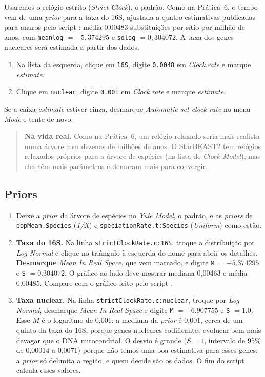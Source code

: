 \documentclass[11pt,a4paper]{article}
\newcommand{\arq}[1]{\path{#1}}
\newcommand{\ui}[1]{\textit{#1}}
\begin{document}
Usaremos o relógio estrito (\ui{Strict Clock}), o padrão. Como na Prática~6, o tempo vem de uma
\emph{prior} para a taxa do 16S, ajustada a quatro estimativas publicadas para anuros
\cite{lemmon2007,fouquet2012sb,gehara2017,dufresnes2022} pelo script \arq{ajuste_taxa.R}: média
0,00483 substituições por sítio por milhão de anos, com \verb|meanlog| $= -5{,}374295$ e
\verb|sdlog| $= 0{,}304072$. A taxa dos genes nucleares será estimada a partir dos dados.
\begin{enumerate}
\item Na lista da esquerda, clique em \verb|16S|, digite \verb|0.0048| em \ui{Clock.rate} e
marque \ui{estimate}.
\item Clique em \verb|nuclear|, digite \verb|0.001| em \ui{Clock.rate} e marque \ui{estimate}.
\end{enumerate}
Se a caixa \ui{estimate} estiver cinza, desmarque \ui{Automatic set clock rate} no menu
\ui{Mode} e tente de novo.

\begin{quote}\small
\textbf{Na vida real.} Como na Prática~6, um relógio relaxado seria mais realista numa árvore
com dezenas de milhões de anos. O StarBEAST2 tem relógios relaxados próprios para a árvore de
espécies (na lista de \ui{Clock Model}), mas eles têm mais parâmetros e demoram mais para
convergir.
\end{quote}

\subsection{Priors}\label{sec:priors}

\begin{enumerate}
\item Deixe a \emph{prior} da árvore de espécies no \ui{Yule Model}, o padrão, e as
\emph{priors} de \verb|popMean.Species| (\ui{1/X}) e \verb|speciationRate.t:Species|
(\ui{Uniform}) como estão.

\item \textbf{Taxa do 16S.} Na linha \verb|strictClockRate.c:16S|, troque a distribuição por
\ui{Log Normal} e clique no triângulo à esquerda do nome para abrir os detalhes.
\textbf{Desmarque} \ui{Mean In Real Space}, que vem marcado, e digite \verb|M| $= -5.374295$ e
\verb|S| $= 0.304072$. O gráfico ao lado deve mostrar mediana 0,00463 e média 0,00485. Compare
com o gráfico feito pelo script \arq{ajuste_taxa.R}.

\item \textbf{Taxa nuclear.} Na linha \verb|strictClockRate.c:nuclear|, troque por \ui{Log
Normal}, desmarque \ui{Mean In Real Space} e digite \verb|M| $= -6.907755$ e \verb|S| $= 1.0$.
Esse $M$ é o logaritmo de 0,001: a mediana da \emph{prior} é 0,001, cerca de um quinto da taxa
do 16S, porque genes nucleares codificantes evoluem bem mais devagar que o DNA mitocondrial. O
desvio é grande ($S = 1$, intervalo de 95\% de 0,00014 a 0,0071) porque não temos uma boa
estimativa para esses genes: a \emph{prior} só delimita a região, e quem decide são os dados. O
fim do script \arq{ajuste_taxa.R} calcula esses valores.
\end{enumerate}
\end{document}
